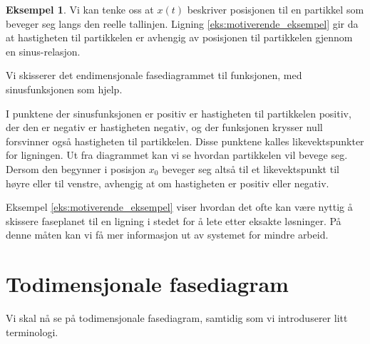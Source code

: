 \documentclass{article}
\theoremstyle{plain}
\theoremstyle{definition}
\newtheorem{eksempel}[teorem]{Eksempel}
\theoremstyle{remark}
\newcommand{\fcn}{x}
\begin{document}
\begin{eksempel}
    Vi kan tenke oss at $\fcn(t)$ beskriver posisjonen til en partikkel som beveger seg langs den reelle tallinjen. Ligning \eqref{eks:motiverende_eksempel} gir da at hastigheten til partikkelen er avhengig av posisjonen til partikkelen gjennom en sinus-relasjon.


    Vi skisserer det endimensjonale fasediagrammet til funksjonen, med sinusfunksjonen som hjelp.
    \begin{center}
    \end{center}
    
    I punktene der sinusfunksjonen er positiv er hastigheten til partikkelen positiv, der den er negativ er hastigheten negativ, og der funksjonen krysser null forsvinner også hastigheten til partikkelen. Disse punktene kalles likevektspunkter for ligningen. Ut fra diagrammet kan vi se hvordan partikkelen vil bevege seg. Dersom den begynner i posisjon $x_0$ beveger seg altså til et likevektspunkt til høyre eller til venstre, avhengig at om hastigheten er positiv eller negativ.
\end{eksempel}

Eksempel \ref{eks:motiverende_eksempel} viser hvordan det ofte kan være nyttig å skissere faseplanet til en ligning i stedet for å lete etter eksakte løsninger. På denne måten kan vi få mer informasjon ut av systemet for mindre arbeid.


\section*{Todimensjonale fasediagram}
Vi skal nå se på todimensjonale fasediagram, samtidig som vi introduserer litt terminologi.
\end{document}
